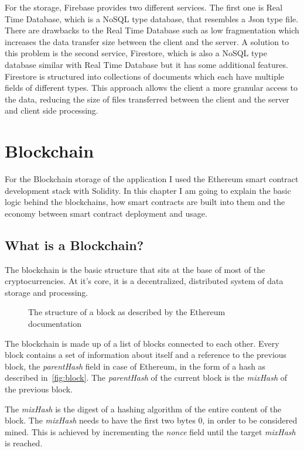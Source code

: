 \documentclass[a4paper,12pt]{report}
\begin{document}
For the storage, Firebase provides two different services. The first one is
Real Time Database, which is a NoSQL type database, that resembles a Json type
file. There are drawbacks to the Real Time Database such as low fragmentation
which increases the data transfer size between the client and the server. A
solution to this problem is the second service, Firestore, which is also a
NoSQL type database similar with Real Time Database but it has some additional
features. Firestore is structured into collections of documents which each have
multiple fields of different types. This approach allows the client a more
granular access to the data, reducing the size of files transferred between the
client and the server and client side processing.

\section{Blockchain}

For the Blockchain storage of the application I used the Ethereum smart
contract development stack with Solidity. In this chapter I am going to explain
the basic logic behind the blockchains, how smart contracts are built into them
and the economy between smart contract deployment and usage.

\subsection{What is a Blockchain?}

The blockchain is the basic structure that sits at the base of most of the
cryptocurrencies. At it's core, it is a decentralized, distributed system of
data storage and processing.

\begin{figure}[H]
    \centering
    \scalebox{1}{}
    \caption{The structure of a block as described by the Ethereum documentation\cite{ethereumDocs}}\label{fig:block}
\end{figure}

The blockchain is made up of a list of blocks connected to each other. Every
block contains a set of information about itself and a reference to the
previous block, the \textit{parentHash} field in case of Ethereum, in the form
of a hash as described in~\autoref{fig:block}. The \textit{parentHash} of the
current block is the \textit{mixHash} of the previous block.

The \textit{mixHash} is the digest of a hashing algorithm of the entire content
of the block. The \textit{mixHash} needs to have the first two bytes 0, in
order to be considered mined. This is achieved by incrementing the
\textit{nonce} field until the target \textit{mixHash} is reached.
\end{document}
